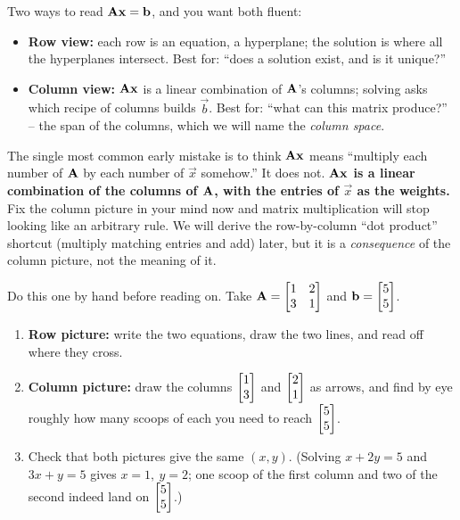 \begin{focusbox}
Two ways to read $\mathbf{A}\mathbf{x} = \mathbf{b}$, and you want both fluent:
\begin{itemize}
  \item \textbf{Row view:} each row is an equation, a hyperplane; the solution is where all the
  hyperplanes intersect. Best for: ``does a solution exist, and is it unique?''
  \item \textbf{Column view:} $\mathbf{A}\mathbf{x}$ is a linear combination of $\mathbf{A}$'s columns; solving
  asks which recipe of columns builds $\vec b$. Best for: ``what can this matrix produce?'' -- the
  span of the columns, which we will name the \emph{column space}.
\end{itemize}
\end{focusbox}

\begin{trapbox}
The single most common early mistake is to think $\mathbf{A}\mathbf{x}$ means ``multiply each number of
$\mathbf{A}$ by each number of $\vec x$ somehow.'' It does not. \textbf{$\mathbf{A}\mathbf{x}$ is a linear
combination of the columns of $\mathbf{A}$, with the entries of $\vec x$ as the weights.} Fix the column
picture in your mind now and matrix multiplication will stop looking like an arbitrary rule. We
will derive the row-by-column ``dot product'' shortcut (multiply matching entries and add) later, but it
is a \emph{consequence} of the column picture, not the meaning of it.
\end{trapbox}

\begin{labbox}
Do this one by hand before reading on. Take $\mathbf{A}=\begin{bmatrix}1&2\\3&1\end{bmatrix}$ and
$\mathbf{b}=\begin{bmatrix}5\\5\end{bmatrix}$.
\begin{enumerate}
  \item \textbf{Row picture:} write the two equations, draw the two lines, and read off where they
  cross.
  \item \textbf{Column picture:} draw the columns $\begin{bmatrix}1\\3\end{bmatrix}$ and $\begin{bmatrix}2\\1\end{bmatrix}$ as arrows, and
  find by eye roughly how many scoops of each you need to reach $\begin{bmatrix}5\\5\end{bmatrix}$.
  \item Check that both pictures give the same $(x,y)$. (Solving $x+2y=5$ and $3x+y=5$ gives
  $x=1,\ y=2$; one scoop of the first column and two of the second indeed land on $\begin{bmatrix}5\\5\end{bmatrix}$.)
\end{enumerate}
\end{labbox}

